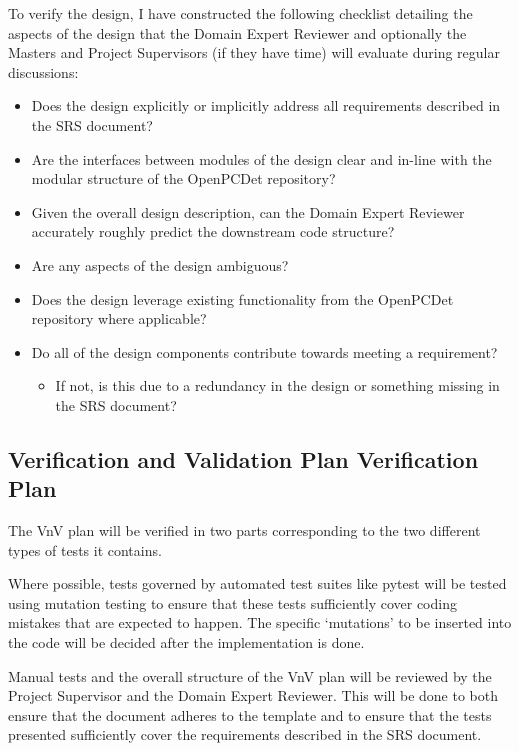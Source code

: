 \documentclass[12pt, titlepage]{article}
\begin{document}
To verify the design, I have constructed the following checklist detailing the aspects of the design
that the Domain Expert Reviewer and optionally the Masters and Project Supervisors (if they have time) 
will evaluate during regular discussions:
\begin{itemize}
  \item Does the design explicitly or implicitly address all requirements described in the SRS document?
  \item Are the interfaces between modules of the design clear and in-line with the modular structure of the OpenPCDet repository?
  \item Given the overall design description, can the Domain Expert Reviewer accurately roughly predict the downstream code structure?
  \item Are any aspects of the design ambiguous?
  \item Does the design leverage existing functionality from the OpenPCDet repository where applicable?
  \item Do all of the design components contribute towards meeting a requirement?
  \begin{itemize}
    \item If not, is this due to a redundancy in the design or something missing in the SRS document?
  \end{itemize}
\end{itemize}

\subsection{Verification and Validation Plan Verification Plan}

The VnV plan will be verified in two parts corresponding to the two different 
types of tests it contains. 

Where possible, tests governed by automated test suites
like pytest will be tested using mutation testing to ensure that these tests sufficiently
cover coding mistakes that are expected to happen. The specific `mutations' to be inserted
into the code will be decided after the implementation is done. 

Manual tests and the overall structure of the VnV plan will be reviewed by the Project Supervisor
and the Domain Expert Reviewer. This will be done to both ensure that the document adheres to the
template and to ensure that the tests presented sufficiently cover the requirements described in
the SRS document.
\end{document}
